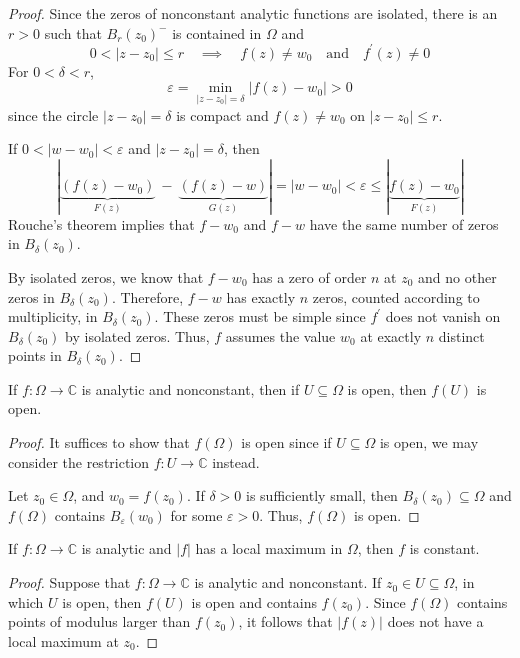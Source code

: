 \documentclass[12pt]{article}
\begin{document}
\begin{proof}
    Since the zeros of nonconstant analytic functions are isolated, there is an $r>0$ such that $B_{r}(z_{0})^{-}$ is contained in $\Omega$ and
$$0<|z-z_{0}|\leq r\quad\implies\quad f(z)\neq w_{0}\quad\text{and}\quad f^{\prime}(z)\neq0$$
For $0<\delta<r$,
$$\varepsilon=\min_{|z-z_{0}|=\delta}|f(z)-w_{0}|>0$$
since the circle $|z-z_{0}|=\delta$ is compact and $f(z)\neq w_{0}$ on $|z-z_{0}|\leq r$.

If $0<|w-w_{0}|<\varepsilon$ and $|z-z_{0}|=\delta$, then
$$|\underbrace{(f(z)-w_{0})}_{F(z)}\ -\ \underbrace{(f(z)-w)}_{G(z)}|=|w-w_{0}|<\varepsilon\leq|\underbrace{f(z)-w_{0}}_{F(z)}|$$
Rouche's theorem implies that $f-w_{0}$ and $f-w$ have the same number of zeros in $B_{\delta}(z_{0})$. 

By isolated zeros, we know that $f-w_{0}$ has a zero of order $n$ at $z_{0}$ and no other zeros in $B_{\delta}(z_{0})$. Therefore, $f-w$ has exactly $n$ zeros, counted according to multiplicity, in $B_{\delta}(z_{0})$. These zeros must be simple since $f^{\prime}$ does not vanish on $B_{\delta}(z_{0})$ by isolated zeros. Thus, $f$ assumes the value $w_0$ at exactly $n$ distinct points in $B_{\delta}(z_{0})$.
\end{proof}

\begin{corollary}
    If $f:\Omega\to\mathbb{C}$ is analytic and nonconstant, then if $U\subseteq\Omega$ is open, then $f(U)$ is open.
\end{corollary}
\begin{proof}
    It suffices to show that $f(\Omega)$ is open since if $U\subseteq\Omega$ is open, we may consider the restriction $f:U\to\mathbb{C}$ instead. 
    
    Let $z_{0}\in\Omega$, and $w_{0}=f(z_{0})$. If $\delta>0$ is sufficiently small, then $B_{\delta}(z_{0})\subseteq\Omega$ and $f(\Omega)$ contains $B_{\varepsilon}(w_{0})$ for some $\varepsilon>0$. Thus, $f(\Omega)$ is open.
\end{proof}

\begin{theorem}
    If $f:\Omega\to\mathbb{C}$ is analytic and $|f|$ has a local maximum in $\Omega$, then $f$ is constant.
\end{theorem}
\begin{proof}
    Suppose that $f:\Omega\to\mathbb{C}$ is analytic and nonconstant. If $z_{0}\in U\subseteq\Omega$, in which $U$ is open, then $f(U)$ is open and contains $f(z_{0})$. Since $f(\Omega)$ contains points of modulus larger than $f(z_{0})$, it follows that $|f(z)|$ does not have a local maximum at $z_{0}$.
\end{proof}
\end{document}
